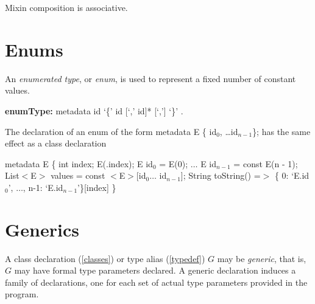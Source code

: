 \documentclass{article}
\newcommand{\code}[1]{{\sf #1}}
\begin{document}
\LMHash{}
Mixin composition is associative.




\section{Enums}

\LMHash{}
An {\em enumerated type}, or {\em enum}, is used to represent a fixed number of constant values.

\begin{grammar}
{\bf enumType:}
metadata \ENUM{} id `\{' id [`,' id]* [`,'] `\}'
    .
\end{grammar}

\LMHash{}
The declaration of an enum of the form \code{metadata \ENUM{} E \{ id$_0$, \ldots id$_{n-1}$\};}
has the same effect as a class declaration

\begin{dartCode}
metadata \CLASS{} E \{
  \FINAL{} int index;
  \CONST{} E(\THIS{}.index);
  \STATIC{} \CONST{} E id$_0$ = \CONST{} E(0);
  $\ldots$
  \STATIC{} \CONST{} E id$_{n-1}$ = const E(n - 1);
  \STATIC{} \CONST{} List$<$E$>$ values = const $<$E$>$[id$_0 \ldots $ id$_{n-1}$];
  String toString() =$>$ \{ 0: `E.id$_0$', $\ldots$, n-1: `E.id$_{n-1}$'\}[index]
\}
\end{dartCode}


\section{Generics}

\LMHash{}
A class declaration (\ref{classes}) or type alias (\ref{typedef})
$G$ may be {\em generic}, that is, $G$ may have formal type parameters declared. A generic declaration induces a family of declarations, one for each set of actual type parameters provided in the program.
\end{document}
